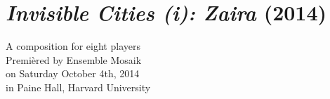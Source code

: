 \chapter{\emph{Invisible Cities (i): Zaira} (2014)}
\label{chap:zaira}

\begin{singlespacing}
\begin{flushright}
A composition for eight players \\
\vspace*{\baselineskip}
Premi\`{e}red by Ensemble Mosaik \\
on Saturday October 4th, 2014 \\
in Paine Hall, Harvard University
\end{flushright}
\end{singlespacing}

